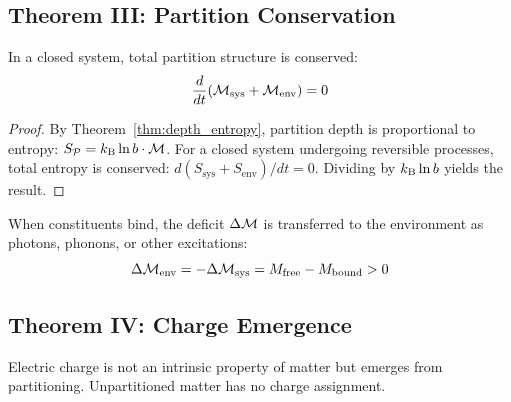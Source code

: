 \subsection{Theorem III: Partition Conservation}

\begin{theorem}
\label{thm:conservation}
In a closed system, total partition structure is conserved:
\begin{equation}
    \frac{d}{dt}\!\left(\mathcal{M}_{\mathrm{sys}} + \mathcal{M}_{\mathrm{env}}\right) = 0
\end{equation}
\end{theorem}

\begin{proof}
By Theorem~\ref{thm:depth_entropy}, partition depth is proportional to entropy: $S_{\mathcal{P}} = k_{\mathrm{B}} \ln b \cdot \mathcal{M}$. For a closed system undergoing reversible processes, total entropy is conserved: $d(S_{\mathrm{sys}} + S_{\mathrm{env}})/dt = 0$. Dividing by $k_{\mathrm{B}} \ln b$ yields the result.
\end{proof}

\begin{corollary}
\label{cor:binding_transfer}
When constituents bind, the deficit $\Delta\mathcal{M}$ is transferred to the environment as photons, phonons, or other excitations:
\begin{equation}
    \Delta\mathcal{M}_{\mathrm{env}} = -\Delta\mathcal{M}_{\mathrm{sys}} = M_{\mathrm{free}} - M_{\mathrm{bound}} > 0
\end{equation}
\end{corollary}

\subsection{Theorem IV: Charge Emergence}

\begin{theorem}
\label{thm:charge_emergence}
Electric charge is not an intrinsic property of matter but emerges from partitioning. Unpartitioned matter has no charge assignment.
\end{theorem}

